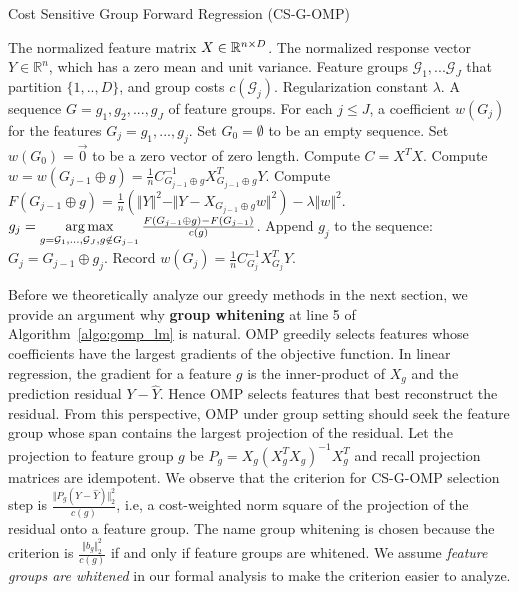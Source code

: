 \begin{algorithm}[tb]
\caption{Cost Sensitive Group Forward Regression (CS-G-OMP)}
 \label{algo:gfr_lm}
\begin{algorithmic}[1]
	 The normalized feature matrix $X \in \mathbb{R}^{n \times D}$.
 	The normalized response vector $Y \in \mathbb{R}^{n}$, which has a zero mean and unit variance. 
    Feature groups $\mathcal{G}_1, ... \mathcal{G}_J$ that partition $\{1,..,D\}$, and group costs $c(\mathcal{G}_j)$.
   Regularization constant $\lambda$.
	 A sequence $G = g_1, g_2, ..., g_{J}$ of feature groups.
   For each $j \leq J$, a coefficient  $w(G_j)$ for the features $G_j =g_1,..., g_j$. 
    \STATE Set $G_0 = \emptyset$ to be an empty sequence.
    \STATE Set $w(G_0) = \vec{0}$ to be a zero vector of zero length.
    \STATE Compute $C = X^TX$. 
        \STATE Compute $w = w(G_{j-1} \oplus g) =  \frac{1}{n}C_{G_{j-1} \oplus g}^{-1}X_{G_{j-1} \oplus g}^TY$.
        \STATE Compute $F(G_{j-1} \oplus g) = \frac{1}{n}(\Vert Y \Vert ^2 - \Vert Y - X_{G_{j-1} \oplus g} w \Vert ^2) 
        	- \lambda \Vert w \Vert ^2$. 
    \ENDFOR
    \STATE $g_{j} = \operatorname*{arg\,max} \limits_{g = \mathcal{G}_1, ... , \mathcal{G}_J, g\notin G_{j-1}} 
	\frac{F(G_{j-1} \oplus g) - F(G_{j-1})}{c(g)}$.
   \STATE Append $g_j$ to the sequence: $G_{j} = G_{j-1} \oplus g_{j}$.
   \STATE Record $w(G_j) = \frac{1}{n}C_{G_{j}}^{-1}X_{G_{j}}^TY$.
 \ENDFOR
\end{algorithmic}
\end{algorithm}


Before we theoretically analyze our greedy methods
in the next section, we provide an argument 
why \textbf{group whitening} at line 5 of Algorithm~\ref{algo:gomp_lm} 
is natural. OMP greedily selects features whose
coefficients have the largest gradients of the objective function. 
In linear regression, the gradient for a feature $g$ 
is the inner-product of $X_g$ and the prediction 
residual $Y-\hat{Y}$. Hence OMP selects features that best reconstruct the 
residual. From this perspective, OMP under group setting 
should seek the feature group whose span contains the largest projection of the residual. 
Let the projection to feature group $g$ be 
$P_g = X_g(X_g^TX_g)^{-1}X_g^T$ and recall projection matrices are
idempotent. We observe that the criterion for CS-G-OMP selection step is
$\frac{\Vert P_g (Y - \hat{Y}) \Vert _2^2 }{c(g)}$, i.e, a cost-weighted
norm square of the projection of the residual onto a feature group. The 
name group whitening is chosen because the criterion is 
$\frac{\Vert b_g \Vert_2^2}{c(g)}$ if and only if feature groups are whitened. We assume \textit{feature groups are whitened} in our formal analysis to make the criterion easier to analyze. 

